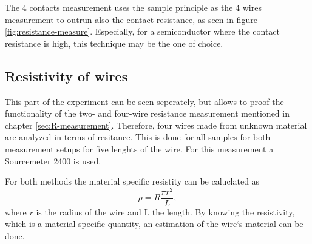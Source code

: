 The 4 contacts measurement uses the sample principle as the 4 wires measurement to outrun also the contact resistance, as seen in figure \ref{fig:resistance-measure}.
Especially, for a semiconductor where the contact resistance is high, this technique may be the one of choice.

\subsection{Resistivity of wires}
\label{sec:wires-theo}

This part of the experiment can be seen seperately, but allows to proof the functionality of the two- and four-wire resistance measurement mentioned in chapter \ref{sec:R-measurement}.
Therefore, four wires made from unknown material are analyzed in terms of resitance.
This is done for all samples for both measurement setups for five lenghts of the wire.
For this measurement a Sourcemeter 2400 is used.

For both methods the material specific resistity can be caluclated as 
\begin{equation}
  \rho = R \frac{\pi r^2}{L},
\end{equation}\label{equ:wires}
where $r$ is the radius of the wire and L the length.
By knowing the resistivity, which is a material specific quantity, an estimation of the wire`s material can be done.
